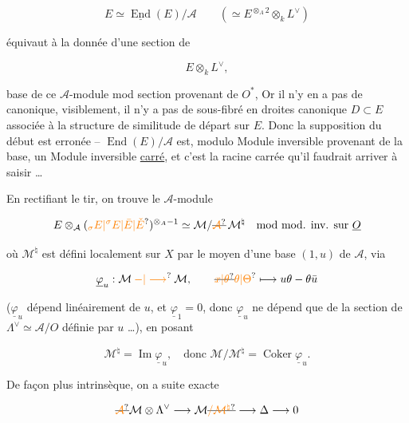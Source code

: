 \[
E\simeq\underline{\operatorname{End}}(E)/\mathcal A\qquad(\simeq E^{\otimes_A2}\otimes_k L^\vee)
\]

équivaut à la donnée d'une section de

\[
E\otimes_k L^\vee,
\]

base de ce $\mathcal A$-module mod section provenant de $O^*$, Or il n'y en a pas de canonique, visiblement,   il n'y a pas de sous-fibré en droites canonique $D\subset E$ associée à la structure de similitude de départ sur $E$. Donc la supposition du début est erronée -- $\operatorname{End}(E)/\mathcal A$ est, modulo Module inversible provenant de la base, un Module inversible \uline{carré}, et c'est la racine carrée qu'il faudrait arriver à saisir \ldots

En rectifiant le tir, on trouve le $\mathcal A$-module

\[
E\otimes_{\mathcal A}(\unsure{{}_{\sigma}E|{}^{\sigma}E|\bar E|\check E})^{\otimes_A-1}\simeq\mathcal M/\deleted{\unsure{\mathcal A}}\,\mathcal M^{\natural}\quad\text{mod mod. inv. sur }\underline O
\]

où $\mathcal M^\natural$ est défini localement sur $X$ par le moyen d'une base $(1,u)$ de $\mathcal A$, via

\[
\underline{\varphi}_u:\mathcal M\mathbin{\unsure{-|\longrightarrow}}\mathcal M,\qquad\deleted{\unsure{x|\theta}}\unsure{\theta|\Theta}\longmapsto u\theta-\theta\bar u
\]


($\underline{\varphi}_u$ dépend linéairement de $u$, et $\underline{\varphi}_1=0$, donc $\underline{\varphi}_u$ ne dépend que de la section  de  $\Lambda^\vee\simeq\mathcal A/O$ définie par $u$ \ldots), en posant

\[
\mathcal M^\natural=\operatorname{Im}\underline{\varphi}_u,\quad\text{donc }\mathcal M/\mathcal M^\natural=\operatorname{Coker}\underline{\varphi}_u.
\]

De façon plus intrinsèque, on a suite exacte

\[
\deleted{\unsure{\mathcal A}}\mathcal M\otimes\Lambda^\vee\longrightarrow\mathcal M\deleted{\unsure{/\mathcal M^\natural}}\longrightarrow\Delta\longrightarrow0
\]

